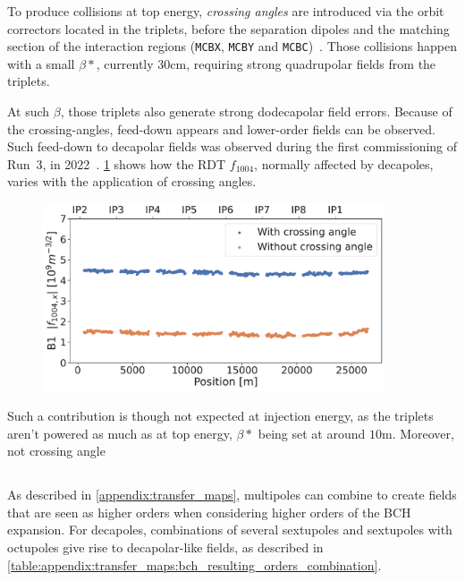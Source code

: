 To produce collisions at top energy, \textit{crossing angles} are introduced via the orbit
correctors located in the triplets, before the separation dipoles and the matching section of the
interaction regions (\texttt{MCBX}, \texttt{MCBY} and \texttt{MCBC})~\cite{de_maria_lhc_2008}. Those
collisions happen with a small $\beta*$, currently 30cm, requiring strong quadrupolar fields from
the triplets.

At such $\beta$, those triplets also generate strong dodecapolar field errors. Because of the
crossing-angles, feed-down appears and lower-order fields can be observed.
Such feed-down to decapolar fields was observed during the first commissioning of Run~3, in
2022~\cite{maclean_prospects_2022}.
\cref{fig:decapoles:f1004_from_feeddown} shows how the RDT $f_{1004}$, normally affected by
decapoles, varies with the application of crossing angles.

\begin{figure}[H]
    \centering
    \includegraphics[width=0.9\textwidth]{./images/f1004x_feed-down_b6_triplets.pdf}
    \caption{}
    \label{fig:decapoles:f1004_from_feeddown}
\end{figure}

Such a contribution is though not expected at injection energy, as the triplets aren't powered as
much as at top energy, $\beta*$ being set at around $10$m. Moreover, not crossing angle

\subsection{}

As described in \cref{appendix:transfer_maps}, multipoles can combine to create fields that are seen
as higher orders when considering higher orders of the BCH expansion.
For decapoles, combinations of several sextupoles and sextupoles with octupoles give rise to
decapolar-like fields, as described in
\cref{table:appendix:transfer_maps:bch_resulting_orders_combination}.


